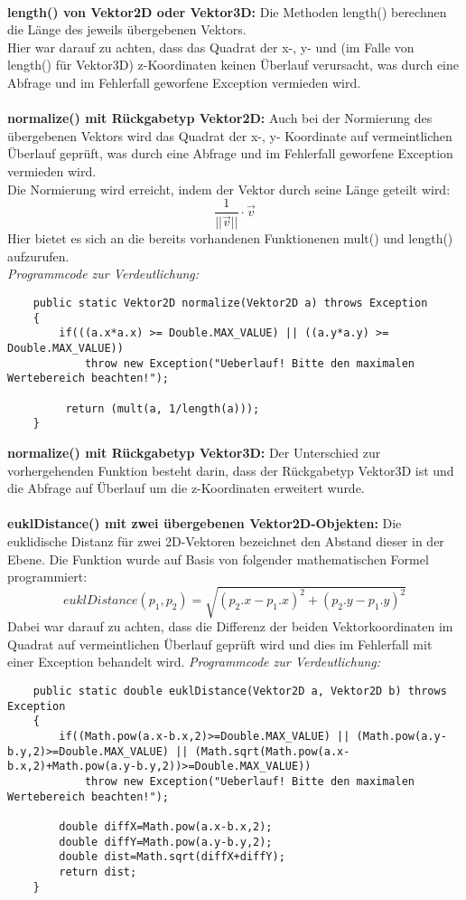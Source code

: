 \documentclass[a4paper,11pt]{scrartcl}
\begin{document}
\\
\textbf{length() von Vektor2D oder Vektor3D: } Die Methoden length() berechnen die Länge des jeweils übergebenen Vektors.\\
Hier war darauf zu achten, dass das Quadrat der x-, y- und (im Falle von length() für Vektor3D) z-Koordinaten keinen Überlauf verursacht, was durch eine Abfrage und im Fehlerfall geworfene Exception vermieden wird.\\
\\
\textbf{normalize() mit Rückgabetyp Vektor2D: } Auch bei der Normierung des übergebenen Vektors wird das Quadrat der x-, y- Koordinate auf vermeintlichen Überlauf geprüft, was durch eine Abfrage und im Fehlerfall geworfene Exception vermieden wird.\\
Die Normierung wird erreicht, indem der Vektor durch seine Länge geteilt wird:
\[ \frac{1}{||\vec v||} \cdot \vec v \]
Hier bietet es sich an die bereits vorhandenen Funktionenen mult() und length() aufzurufen.\\
\textit{Programmcode zur Verdeutlichung:}
\begin{lstlisting}
	public static Vektor2D normalize(Vektor2D a) throws Exception
	{
		if(((a.x*a.x) >= Double.MAX_VALUE) || ((a.y*a.y) >= Double.MAX_VALUE))
			throw new Exception("Ueberlauf! Bitte den maximalen Wertebereich beachten!");
		
		 return (mult(a, 1/length(a)));
	}
\end{lstlisting} $\;$ \\
\textbf{normalize() mit Rückgabetyp Vektor3D:} Der Unterschied zur vorhergehenden Funktion besteht darin, dass der Rückgabetyp Vektor3D ist und die Abfrage auf Überlauf um die z-Koordinaten erweitert wurde.\\
\\
\textbf{euklDistance() mit zwei übergebenen Vektor2D-Objekten:} Die euklidische Distanz für zwei 2D-Vektoren bezeichnet den Abstand dieser in der Ebene. Die Funktion wurde auf Basis von folgender mathematischen Formel programmiert:
\[ euklDistance(p_1,p_2) = \sqrt{(p_2.x - p_1.x)^2 + (p_2.y - p_1.y)^2} \]
Dabei war darauf zu achten, dass die Differenz der beiden Vektorkoordinaten im Quadrat auf vermeintlichen Überlauf geprüft wird und dies im Fehlerfall mit einer Exception behandelt wird.
\textit{Programmcode zur Verdeutlichung:}
\begin{lstlisting}
	public static double euklDistance(Vektor2D a, Vektor2D b) throws Exception
	{
		if((Math.pow(a.x-b.x,2)>=Double.MAX_VALUE) || (Math.pow(a.y-b.y,2)>=Double.MAX_VALUE) || (Math.sqrt(Math.pow(a.x-b.x,2)+Math.pow(a.y-b.y,2))>=Double.MAX_VALUE))
			throw new Exception("Ueberlauf! Bitte den maximalen Wertebereich beachten!");
		
		double diffX=Math.pow(a.x-b.x,2);
		double diffY=Math.pow(a.y-b.y,2);
		double dist=Math.sqrt(diffX+diffY);
		return dist;
	}
\end{lstlisting} $\;$ \\
\end{document}
